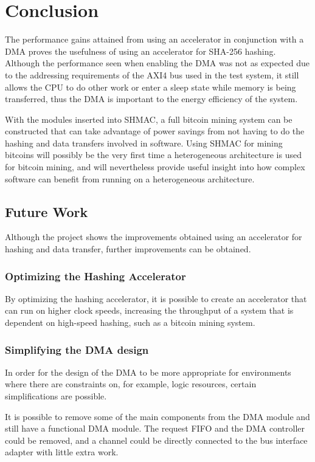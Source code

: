 \chapter{Conclusion}
\label{cha:conclusion}

The performance gains attained from using an accelerator in conjunction with a DMA
proves the usefulness of using an accelerator for SHA-256 hashing. Although the
performance seen when enabling the DMA was not as expected due to the addressing
requirements of the AXI4 bus used in the test system, it still allows the CPU to
do other work or enter a sleep state while memory is being transferred, thus
the DMA is important to the energy efficiency of the system.

With the modules inserted into SHMAC, a full bitcoin mining system can be
constructed that can take advantage of power savings from not having to do
the hashing and data transfers involved in software. Using SHMAC for mining
bitcoins will possibly be the very first time a heterogeneous architecture
is used for bitcoin mining, and will nevertheless provide useful insight
into how complex software can benefit from running on a heterogeneous
architecture.

\section{Future Work}
\label{sec:future-work}

Although the project shows the improvements obtained using an accelerator
for hashing and data transfer, further improvements can be obtained.

\subsection{Optimizing the Hashing Accelerator}
By optimizing the hashing accelerator, it is possible to create an accelerator
that can run on higher clock speeds, increasing the throughput of a system that
is dependent on high-speed hashing, such as a bitcoin mining system.

\subsection{Simplifying the DMA design} 
In order for the design of the DMA to be more appropriate for environments where
there are constraints on, for example, logic resources, certain simplifications
are possible.

It is possible to remove some of the main components from the DMA module and still
have a functional DMA module. The request FIFO and the DMA controller could be removed,
and a channel could be directly connected to the bus interface adapter with little
extra work.

